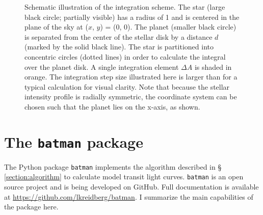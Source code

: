 \documentclass[12pt,preprint]{aastex}
\newcommand*{\blue}{\textcolor{blue}}
\begin{document}
\begin{figure}
\caption{Schematic illustration of the integration scheme. The star (large black circle; partially visible) has a radius of 1 and is centered in the plane of the sky at ($x$, $y$) = (0, 0). The planet (smaller black circle) is separated from the center of the stellar disk by a distance $d$ (marked by the solid black line).  The star is partitioned into concentric circles (dotted lines) in order to calculate the integral over the planet disk.  A single integration element $\Delta A$ is shaded in orange. The integration step size illustrated here is larger than for a typical calculation for visual clarity.  Note that because the stellar intensity profile is radially symmetric, the coordinate system can be chosen such that the planet lies on the x-axis, as shown.}
\label{fig:integration}
\end{figure}

\section{The \texttt{batman} package}
The Python package \texttt{batman} implements the algorithm described in \S\,\ref{section:algorithm} to calculate model transit light curves.  \texttt{batman} is an open source project and is being developed on GitHub.  Full documentation is available at \blue{\url{https://github.com/lkreidberg/batman}}. I summarize the main capabilities of the package here.
\end{document}
